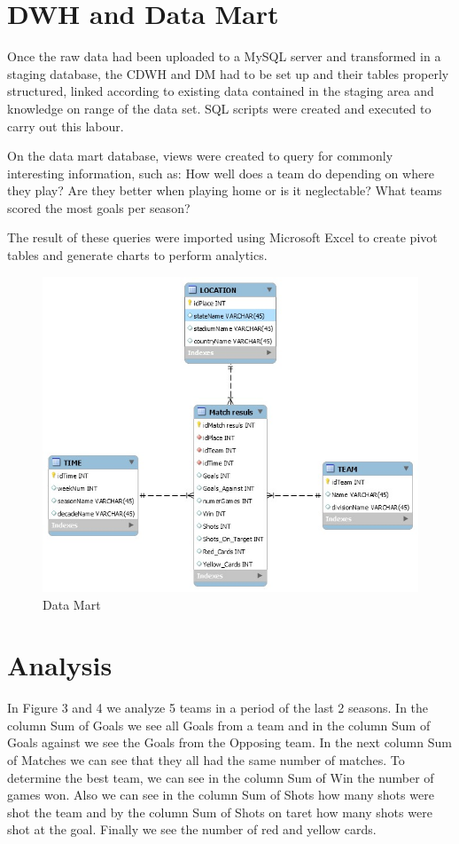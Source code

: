 \documentclass[11pt, journal]{IEEEtran}
\begin{document}
\section{DWH and Data Mart} \label{sec:further}
Once the raw data had been uploaded to a MySQL server and transformed in a staging database, the CDWH and DM had to be set up and their tables
properly structured, linked according to existing data contained in the staging area and knowledge on range of the data set. SQL scripts were 
created and executed to carry out this labour. 

On the data mart database, views were created to query for commonly interesting information, such as: How well does a team do depending on where
they play? Are they better when playing home or is it neglectable? What teams scored the most goals per season?

The result of these queries were imported using Microsoft Excel to create pivot tables and generate charts to perform analytics.

\begin{figure}[htb]
	\centering
		\includegraphics[width=1.0\columnwidth]{images/datamart}
	\caption{Data Mart}
	\label{fig:probov}
\end{figure}
\section{Analysis} \label{sec:analy}
In Figure 3 and 4 we analyze 5 teams in a period of the last 2 seasons. In the column Sum of Goals we see all Goals from a team and in the column Sum of Goals against we see the Goals from the Opposing team. In the next column Sum of Matches we can see that they all had the same number of matches. To determine the best team, we can see in the column Sum of Win the number of games won. Also we can see in the column Sum of Shots how many shots were shot the team and by the column Sum of Shots on taret how many shots were shot at the goal. Finally we see the number of red and yellow cards.
\end{document}
